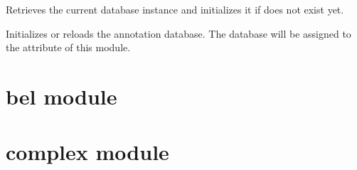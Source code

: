\documentclass[letterpaper,10pt,english]{sphinxmanual}
\begin{document}
\begin{fulllineitems}
\label{\detokenize{reference:pypath.annot.Vesiclepedia}}
\end{fulllineitems}


\begin{fulllineitems}
\label{\detokenize{reference:pypath.annot.Zhong2015}}
\end{fulllineitems}


\begin{fulllineitems}
\label{\detokenize{reference:pypath.annot.get_db}}
Retrieves the current database instance and initializes it if does
not exist yet.

\end{fulllineitems}


\begin{fulllineitems}
\label{\detokenize{reference:pypath.annot.init_db}}
Initializes or reloads the annotation database.
The database will be assigned to the  attribute of this module.

\end{fulllineitems}



\section{bel module}
\label{\detokenize{reference:bel-module}}

\section{complex module}
\label{\detokenize{reference:module-pypath.complex}}\label{\detokenize{reference:complex-module}}
\end{document}
